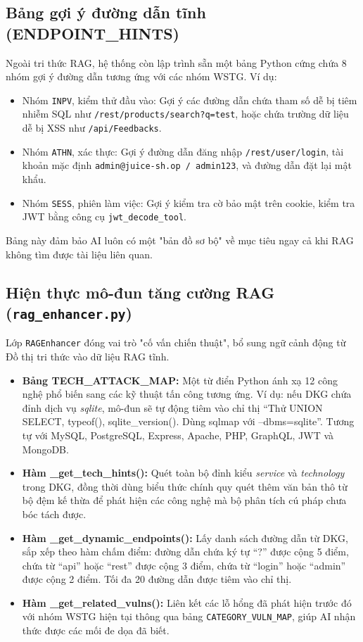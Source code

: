 \subsection{Bảng gợi ý đường dẫn tĩnh (ENDPOINT\_HINTS)}
Ngoài tri thức RAG, hệ thống còn lập trình sẵn một bảng Python cứng chứa 8 nhóm gợi ý đường dẫn tương ứng với các nhóm WSTG. Ví dụ:
\begin{itemize}
    \item Nhóm \texttt{INPV}, kiểm thử đầu vào: Gợi ý các đường dẫn chứa tham số dễ bị tiêm nhiễm SQL như \texttt{/rest/products/search?q=test}, hoặc chứa trường dữ liệu dễ bị XSS như \texttt{/api/Feedbacks}.
    \item Nhóm \texttt{ATHN}, xác thực: Gợi ý đường dẫn đăng nhập \texttt{/rest/user/login}, tài khoản mặc định \texttt{admin@juice-sh.op / admin123}, và đường dẫn đặt lại mật khẩu.
    \item Nhóm \texttt{SESS}, phiên làm việc: Gợi ý kiểm tra cờ bảo mật trên cookie, kiểm tra JWT bằng công cụ \texttt{jwt\_decode\_tool}.
\end{itemize}
Bảng này đảm bảo AI luôn có một "bản đồ sơ bộ" về mục tiêu ngay cả khi RAG không tìm được tài liệu liên quan.

\subsection{Hiện thực mô-đun tăng cường RAG (\texttt{rag\_enhancer.py})}
Lớp \texttt{RAGEnhancer} đóng vai trò "cố vấn chiến thuật", bổ sung ngữ cảnh động từ Đồ thị tri thức vào dữ liệu RAG tĩnh.
\begin{itemize}
    \item \textbf{Bảng TECH\_ATTACK\_MAP:} Một từ điển Python ánh xạ 12 công nghệ phổ biến sang các kỹ thuật tấn công tương ứng. Ví dụ: nếu DKG chứa đỉnh dịch vụ \textit{sqlite}, mô-đun sẽ tự động tiêm vào chỉ thị ``Thử UNION SELECT, typeof(), sqlite\_version(). Dùng sqlmap với --dbms=sqlite''. Tương tự với MySQL, PostgreSQL, Express, Apache, PHP, GraphQL, JWT và MongoDB.
    \item \textbf{Hàm \_get\_tech\_hints():} Quét toàn bộ đỉnh kiểu \textit{service} và \textit{technology} trong DKG, đồng thời dùng biểu thức chính quy quét thêm văn bản thô từ bộ đệm kế thừa để phát hiện các công nghệ mà bộ phân tích cú pháp chưa bóc tách được.
    \item \textbf{Hàm \_get\_dynamic\_endpoints():} Lấy danh sách đường dẫn từ DKG, sắp xếp theo hàm chấm điểm: đường dẫn chứa ký tự ``?'' được cộng 5 điểm, chứa từ ``api'' hoặc ``rest'' được cộng 3 điểm, chứa từ ``login'' hoặc ``admin'' được cộng 2 điểm. Tối đa 20 đường dẫn được tiêm vào chỉ thị.
    \item \textbf{Hàm \_get\_related\_vulns():} Liên kết các lỗ hổng đã phát hiện trước đó với nhóm WSTG hiện tại thông qua bảng \texttt{CATEGORY\_VULN\_MAP}, giúp AI nhận thức được các mối đe dọa đã biết.
\end{itemize}

